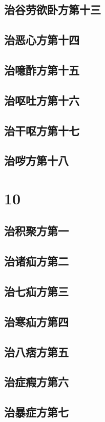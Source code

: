 \documentclass[a4paper,12pt,UTF8,twoside]{ctexbook}
\begin{document}
\chapter{治谷劳欲卧方第十三}
\chapter{治恶心方第十四}
\chapter{治噫酢方第十五}
\chapter{治呕吐方第十六}
\chapter{治干呕方第十七}
\chapter{治哕方第十八}

\part{10}
\chapter{治积聚方第一}
\chapter{治诸疝方第二}
\chapter{治七疝方第三}
\chapter{治寒疝方第四}
\chapter{治八痞方第五}
\chapter{治症瘕方第六}
\chapter{治暴症方第七}
\end{document}
